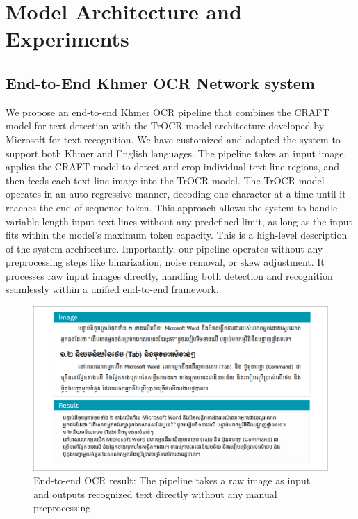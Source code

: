 \chapter{Model Architecture and Experiments}
\label{ch:experiments}


\section{End-to-End Khmer OCR Network system}
\label{sec:end_to_end_khmer_ocr_sysetm}

We propose an end-to-end Khmer OCR pipeline that combines the CRAFT model 
for text detection with the TrOCR model architecture developed by Microsoft 
for text recognition. We have customized and adapted the system to support 
both Khmer and English languages. The pipeline takes an input image, applies 
the CRAFT model to detect and crop individual text-line regions, and then 
feeds each text-line image into the TrOCR model.
The TrOCR model operates in an auto-regressive manner, decoding one character 
at a time until it reaches the end-of-sequence token. This approach allows the 
system to handle variable-length input text-lines without any predefined limit, 
as long as the input fits within the model’s maximum token capacity.
This is a high-level description of the system architecture. Importantly, 
our pipeline operates without any preprocessing steps like binarization, 
noise removal, or skew adjustment. It processes raw input images directly, 
handling both detection and recognition seamlessly within a unified end-to-end 
framework.

\begin{figure}[H]
    \centering
    \includegraphics[width=\textwidth]{figures/result_image_to_text.png}
    \caption{End-to-end OCR result: The pipeline takes a raw image as input 
    and outputs recognized text directly without any manual preprocessing.}
    \label{fig:result_converted}
\end{figure}


